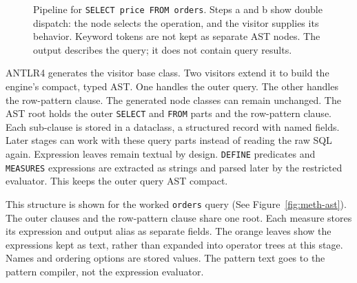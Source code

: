 \begin{figure}[htbp]
  \caption[Visitor pipeline: from SQL to an AST]{Pipeline for
    \texttt{SELECT price FROM orders}.  Steps a and b show double
    dispatch: the node selects the operation, and the visitor supplies
    its behavior.  Keyword tokens are not kept as separate AST nodes.
    The output describes the query; it does not contain query results.}
  \label{fig:visitor-dispatch}
\end{figure}

ANTLR4 generates the visitor base class.  Two visitors extend it to
build the engine's compact, typed AST.  One handles the outer query.
The other handles the row-pattern clause.  The generated node classes
can remain unchanged.  The AST root holds the outer \texttt{SELECT}
and \texttt{FROM} parts and the row-pattern clause.  Each sub-clause
is stored in a dataclass, a structured record with named fields.
Later stages can work with these query parts instead of reading the
raw SQL again.
Expression leaves remain textual by design.  \texttt{DEFINE}
predicates and \texttt{MEASURES} expressions are extracted as strings
and parsed later by the restricted evaluator.  This keeps the outer
query AST compact.

This structure is shown for the worked \texttt{orders} query (See
Figure~\ref{fig:meth-ast}).  The outer clauses and the row-pattern clause
share one root.  Each measure stores its expression and output alias
as separate fields.  The orange leaves show the expressions kept as
text, rather than expanded into operator trees at this stage.
Names and ordering options are stored values.  The pattern text goes
to the pattern compiler, not the expression evaluator.


